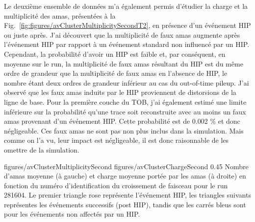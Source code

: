 Le deuxième ensemble de données m'a également permis d'étudier la charge et la multiplicité des amas, présentées à la Fig.~\ref{fig:figures/avClusterMultiplicitySecondT2}, en présence d'un événement HIP ou juste après. J'ai découvert que la multiplicité de faux amas augmente après l'événement HIP par rapport à un événement standard non influencé par un HIP. Cependant, la probabilité d'avoir un HIP est faible et, par conséquent, en moyenne sur le run, la multiplicité de faux amas résultant du HIP est du même ordre de grandeur que la multiplicité de faux amas en l'absence de HIP, le nombre  étant deux ordres de grandeur inférieur au cas du out-of-time pileup. J'ai observé que les faux amas induits par le HIP proviennent de distorsions de la ligne de base. Pour la première couche du TOB, j'ai également estimé une limite inférieure sur la probabilité qu'une trace soit reconstruite avec au moins un faux amas provenant d'un événement HIP. Cette probabilité est de 0.002 \% et donc négligeable. Ces faux amas ne sont pas non plus inclus dans la simulation. Mais comme on l’a vu, leur impact est négligeable, il est donc raisonnable de les omettre de la simulation.


                 {figures/avClusterMultiplicitySecond} %
                 {figures/avClusterChargeSecond} %
                 {0.45}       %
                 {Nombre d'amas moyenne (à gauche) et charge moyenne portée par les amas (à droite) en fonction du numéro d'identification du croissement de faisceau pour le run 281604. Le premier triangle rose représente l’événement HIP, les triangles suivants représentes les événements successifs (post HIP), tandis que les carrés bleus sont pour les événements non affectés par un HIP. }



